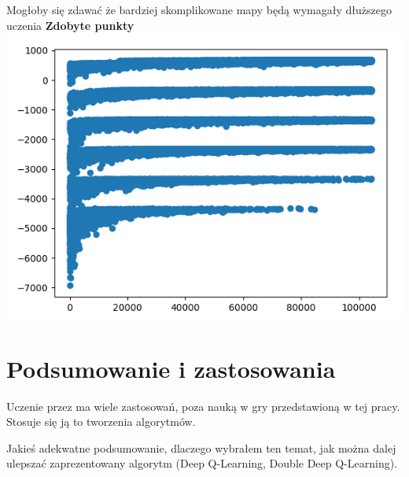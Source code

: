 \documentclass[a4paper,12pt]{article}
\begin{document}
Mogłoby się zdawać że bardziej skomplikowane mapy będą wymagały dłuższego uczenia \newline \newline
\textbf{\Large{Zdobyte punkty}} \newline
\includegraphics[scale=0.9]{testy/wykres7.png}
\newline \newline


\section{Podsumowanie i zastosowania}

Uczenie przez ma wiele zastosowań, poza nauką w gry przedstawioną w tej pracy. Stosuje się ją to tworzenia algorytmów.

 Jakieś adekwatne podsumowanie, dlaczego wybrałem ten temat, jak można dalej ulepszać zaprezentowany algorytm (Deep Q-Learning, Double Deep Q-Learning).
\end{document}
